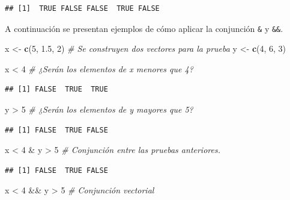 \documentclass[10pt,]{krantz}
\makeatletter
\newenvironment{Shaded}{\begin{snugshade}}{\end{snugshade}}
\newcommand{\KeywordTok}[1]{\textcolor[rgb]{0.13,0.29,0.53}{\textbf{{#1}}}}
\newcommand{\DecValTok}[1]{\textcolor[rgb]{0.00,0.00,0.81}{{#1}}}
\newcommand{\FloatTok}[1]{\textcolor[rgb]{0.00,0.00,0.81}{{#1}}}
\newcommand{\StringTok}[1]{\textcolor[rgb]{0.31,0.60,0.02}{{#1}}}
\newcommand{\CommentTok}[1]{\textcolor[rgb]{0.56,0.35,0.01}{\textit{{#1}}}}
\newcommand{\NormalTok}[1]{{#1}}
\newenvironment{kframe}{%
\medskip{}
\setlength{\fboxsep}{.8em}
 \def\at@end@of@kframe{}%
 \ifinner\ifhmode%
  \def\at@end@of@kframe{\end{minipage}}%
  \begin{minipage}{\columnwidth}%
 \fi\fi%
 \def\FrameCommand##1{\hskip\@totalleftmargin \hskip-\fboxsep
 \colorbox{shadecolor}{##1}\hskip-\fboxsep
     \hskip-\linewidth \hskip-\@totalleftmargin \hskip\columnwidth}%
 \MakeFramed {\advance\hsize-\width
   \@totalleftmargin\z@ \linewidth\hsize
   \@setminipage}}%
 {\par\unskip\endMakeFramed%
 \at@end@of@kframe}
\renewenvironment{Shaded}{\begin{kframe}}{\end{kframe}}
\makeatother
\begin{document}
\begin{verbatim}
## [1]  TRUE FALSE FALSE  TRUE FALSE
\end{verbatim}

A continuación se presentan ejemplos de cómo aplicar la conjunción
\texttt{\&} y \texttt{\&\&}.

\begin{Shaded}
\begin{Highlighting}[]
\NormalTok{x <-}\StringTok{ }\KeywordTok{c}\NormalTok{(}\DecValTok{5}\NormalTok{, }\FloatTok{1.5}\NormalTok{, }\DecValTok{2}\NormalTok{)  }\CommentTok{# Se construyen dos vectores para la prueba}
\NormalTok{y <-}\StringTok{ }\KeywordTok{c}\NormalTok{(}\DecValTok{4}\NormalTok{, }\DecValTok{6}\NormalTok{, }\DecValTok{3}\NormalTok{)}

\NormalTok{x <}\StringTok{ }\DecValTok{4}  \CommentTok{# ¿Serán los elementos de x menores que 4?}
\end{Highlighting}
\end{Shaded}

\begin{verbatim}
## [1] FALSE  TRUE  TRUE
\end{verbatim}

\begin{Shaded}
\begin{Highlighting}[]
\NormalTok{y >}\StringTok{ }\DecValTok{5}  \CommentTok{# ¿Serán los elementos de y mayores que 5?}
\end{Highlighting}
\end{Shaded}

\begin{verbatim}
## [1] FALSE  TRUE FALSE
\end{verbatim}

\begin{Shaded}
\begin{Highlighting}[]
\NormalTok{x <}\StringTok{ }\DecValTok{4} \NormalTok{&}\StringTok{ }\NormalTok{y >}\StringTok{ }\DecValTok{5}  \CommentTok{# Conjunción entre las pruebas anteriores.}
\end{Highlighting}
\end{Shaded}

\begin{verbatim}
## [1] FALSE  TRUE FALSE
\end{verbatim}

\begin{Shaded}
\begin{Highlighting}[]
\NormalTok{x <}\StringTok{ }\DecValTok{4} \NormalTok{&&}\StringTok{ }\NormalTok{y >}\StringTok{ }\DecValTok{5}  \CommentTok{# Conjunción vectorial}
\end{Highlighting}
\end{Shaded}
\end{document}
